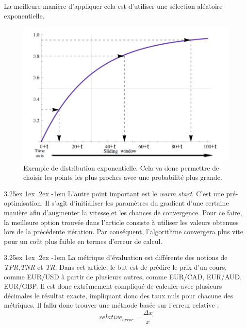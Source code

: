 \documentclass[a4paper, 11pt]{article}
\makeatletter
\renewcommand\paragraph{\@startsection{paragraph}{5}{\z@}%
  {3.25ex \@plus1ex \@minus.2ex}%
  {-1em}%
  {\normalfont\normalsize\bfseries}}
\makeatother
\begin{document}
La meilleure manière d'appliquer cela est d'utiliser une sélection aléatoire exponentielle.

\begin{figure}[H]
\centering
\includegraphics[scale=0.40]{images/choix_exp}
\caption[]{Exemple de distribution exponentielle\footnotemark.
Cela va donc permettre de choisir les points les plus proches avec une probabilité plus grande.}
\end{figure}


\paragraph{}
L'autre point important est le \textit{warm start}. C'est une pré-optimisation.
Il s'agît d'initialiser les paramètres du gradient d'une certaine manière afin d'augmenter la vitesse et les chances
de convergence. Pour ce faire, la meilleure option trouvée dans l'article \cite{descente_du_gradient_stochastique}
consiste à utiliser les valeurs obtenues lors de la précédente itération.
Par conséquent, l'algorithme convergera plus vite pour un coût plus faible en termes d'erreur de calcul.

\paragraph{}
La métrique d'évaluation est différente des notions de \textit{TPR},\textit{TNR} et \textit{TR}.
Dans cet article, le but est de prédire le prix d'un cours, comme EUR/USD à partir de plusieurs autres,
comme EUR/CAD, EUR/AUD, EUR/GBP. Il est donc extrêmement compliqué de calculer avec plusieurs décimales
le résultat exacte, impliquant donc des taux nuls pour chacune des métriques.
Il fallu donc trouver une méthode basée sur l'erreur relative :
$$relative_{error} = \frac{\Delta x}{x}$$
\end{document}
